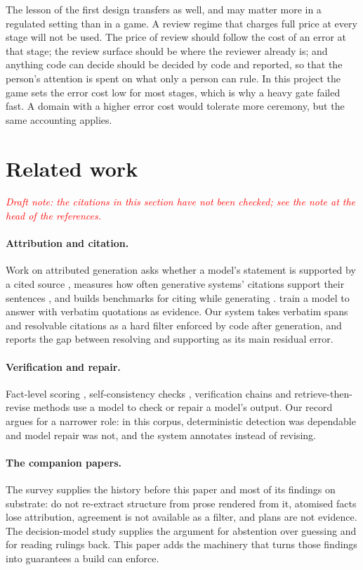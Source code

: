 \documentclass[11pt]{article}
\begin{document}
The lesson of the first design transfers as well, and may matter more in a regulated
setting than in a game. A review regime that charges full price at every stage will not
be used. The price of review should follow the cost of an error at that stage; the
review surface should be where the reviewer already is; and anything code can decide
should be decided by code and reported, so that the person's attention is spent on
what only a person can rule. In this project the game sets the error cost low for most
stages, which is why a heavy gate failed fast. A domain with a higher error cost would
tolerate more ceremony, but the same accounting applies.

\section{Related work}

\textcolor{red}{\emph{Draft note: the citations in this section have not been checked;
see the note at the head of the references.}}

\paragraph{Attribution and citation.} Work on attributed generation asks whether a
model's statement is supported by a cited source \citep{rashkin2023ais,bohnet2022aqa},
measures how often generative systems' citations support their sentences
\citep{liu2023verifiability}, and builds benchmarks for citing while generating
\citep{gao2023alce}. \citet{menick2022quotes} train a model to answer with verbatim
quotations as evidence. Our system takes verbatim spans and resolvable citations as a
hard filter enforced by code after generation, and reports the gap between resolving
and supporting as its main residual error.

\paragraph{Verification and repair.} Fact-level scoring \citep{min2023factscore},
self-consistency checks \citep{manakul2023selfcheck}, verification chains
\citep{dhuliawala2023cove} and retrieve-then-revise methods \citep{gao2023rarr} use a
model to check or repair a model's output. Our record argues for a narrower role: in
this corpus, deterministic detection was dependable and model repair was not, and the
system annotates instead of revising.

\paragraph{The companion papers.} The survey \citep{roussos2026survey} supplies the
history before this paper and most of its findings on substrate: do not re-extract
structure from prose rendered from it, atomised facts lose attribution, agreement is not
available as a filter, and plans are not evidence. The decision-model study
\citep{roussos2026decision} supplies the argument for abstention over guessing and for
reading rulings back. This paper adds the machinery that turns those findings into
guarantees a build can enforce.
\end{document}
